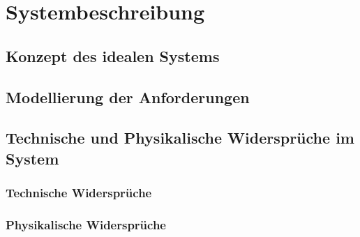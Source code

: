 \chapter{Systembeschreibung}
\label{ch:systembeschreibung}
\section{Konzept des idealen Systems}
\label{sec:concept_ideal_system}
\section{Modellierung der Anforderungen}
\label{sec:model_anforderungen}
\section{Technische und Physikalische Widersprüche im System}
\label{sec:widersprueche}
\subsection{Technische Widersprüche}
\label{subsec:techinical}
\subsection{Physikalische Widersprüche}
\label{subsec:physical}